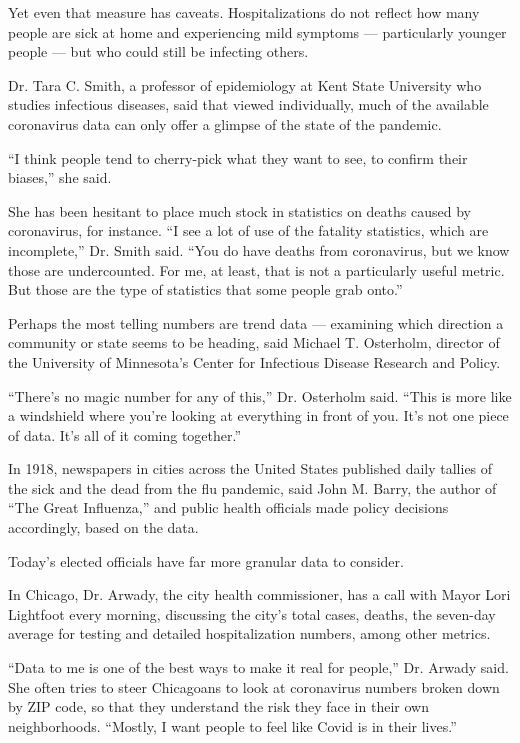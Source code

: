 Yet even that measure has caveats. Hospitalizations do not reflect how
many people are sick at home and experiencing mild symptoms ---
particularly younger people --- but who could still be infecting others.

Dr. Tara C. Smith, a professor of epidemiology at Kent State University
who studies infectious diseases, said that viewed individually, much of
the available coronavirus data can only offer a glimpse of the state of
the pandemic.

``I think people tend to cherry-pick what they want to see, to confirm
their biases,'' she said.

She has been hesitant to place much stock in statistics on deaths caused
by coronavirus, for instance. ``I see a lot of use of the fatality
statistics, which are incomplete,'' Dr. Smith said. ``You do have deaths
from coronavirus, but we know those are undercounted. For me, at least,
that is not a particularly useful metric. But those are the type of
statistics that some people grab onto.''

Perhaps the most telling numbers are trend data --- examining which
direction a community or state seems to be heading, said Michael T.
Osterholm, director of the University of Minnesota's Center for
Infectious Disease Research and Policy.

``There's no magic number for any of this,'' Dr. Osterholm said. ``This
is more like a windshield where you're looking at everything in front of
you. It's not one piece of data. It's all of it coming together.''

In 1918, newspapers in cities across the United States published daily
tallies of the sick and the dead from the flu pandemic, said John M.
Barry, the author of ``The Great Influenza,'' and public health
officials made policy decisions accordingly, based on the data.

Today's elected officials have far more granular data to consider.

In Chicago, Dr. Arwady, the city health commissioner, has a call with
Mayor Lori Lightfoot every morning, discussing the city's total cases,
deaths, the seven-day average for testing and detailed hospitalization
numbers, among other metrics.

``Data to me is one of the best ways to make it real for people,'' Dr.
Arwady said. She often tries to steer Chicagoans to look at coronavirus
numbers broken down by ZIP code, so that they understand the risk they
face in their own neighborhoods. ``Mostly, I want people to feel like
Covid is in their lives.''

